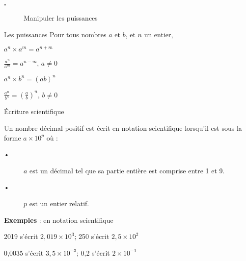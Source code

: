 \begin{titre}

\end{titre}


\begin{CpsCol}
\begin{description}
\item[$\square$] Manipuler les puissances
\end{description}
\end{CpsCol}

\begin{minipage}{0.5\linewidth}
\begin{ThT}{Les puissances}
Pour tous nombres $a$ et $b$, et $n$ un entier, 
\begin{description}
\item $a^n \times a^m = a^{n+m}$
\item $\frac{a^n}{a^m}=a^{n-m}$, $a \neq 0$
\item $a^n \times b^n = (ab)^n$
\item $\frac{a^n}{b^n}=\left( \frac{a}{b} \right)^n$, $b \neq 0$

\end{description}
\end{ThT}
\end{minipage}
\begin{minipage}{0.5\linewidth}
\begin{DefT}{Écriture scientifique}
 
Un nombre décimal positif est écrit en notation scientifique lorsqu'il est sous la forme $a \times 10^p$ où :
\begin{description}
\item[•] $a$ est un décimal tel que sa partie entière est comprise entre 1 et 9.
\item[•] $p$ est un entier relatif. 
\end{description}
\textbf{Exemples} : en notation scientifique
\begin{description}
\item 2019 s'écrit $2,019\times10^{3}$; 250 s'écrit $2,5\times10^{2}$
\item 0,0035 s'écrit $3,5\times10^{-3}$; 0,2 s'écrit $2\times10^{-1}$ 
\end{description}
\end{DefT}
\end{minipage}




